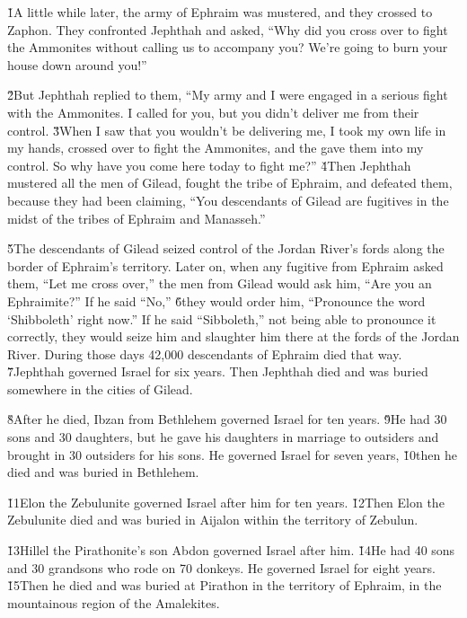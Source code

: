 \v{1}A little while later, the army of Ephraim was mustered, and they crossed to Zaphon. They confronted Jephthah and asked, ``Why did you cross over to fight the Ammonites without calling us to accompany you? We're going to burn your house down around you!''

\v{2}But Jephthah replied to them, ``My army and I were engaged in a serious fight with the Ammonites. I called for you, but you didn't deliver me from their control. \v{3}When I saw that you wouldn't be delivering me, I took my own life in my hands, crossed over to fight the Ammonites, and the  gave them into my control. So why have you come here today to fight me?'' \v{4}Then Jephthah mustered all the men of Gilead, fought the tribe of Ephraim, and defeated them, because they had been claiming, ``You descendants of Gilead are fugitives in the midst of the tribes of Ephraim and Manasseh.''

\v{5}The descendants of Gilead seized control of the Jordan River's fords along the border of Ephraim's territory. Later on, when any fugitive from Ephraim asked them, ``Let me cross over,'' the men from Gilead would ask him, ``Are you an Ephraimite?'' If he said ``No,'' \v{6}they would order him, ``Pronounce the word `Shibboleth' right now.'' If he said ``Sibboleth,'' not being able to pronounce it correctly, they would seize him and slaughter him there at the fords of the Jordan River. During those days 42,000 descendants of Ephraim died that way. \v{7}Jephthah governed Israel for six years. Then Jephthah died and was buried somewhere in the cities of Gilead.

\v{8}After he died, Ibzan from Bethlehem governed Israel for ten years. \v{9}He had 30 sons and 30 daughters, but he gave his daughters in marriage to outsiders and brought in 30 outsiders for his sons. He governed Israel for seven years, \v{10}then he died and was buried in Bethlehem.

\v{11}Elon the Zebulunite governed Israel after him for ten years. \v{12}Then Elon the Zebulunite died and was buried in Aijalon within the territory of Zebulun.

\v{13}Hillel the Pirathonite's son Abdon governed Israel after him. \v{14}He had 40 sons and 30 grandsons who rode on 70 donkeys. He governed Israel for eight years. \v{15}Then he died and was buried at Pirathon in the territory of Ephraim, in the mountainous region of the Amalekites.

